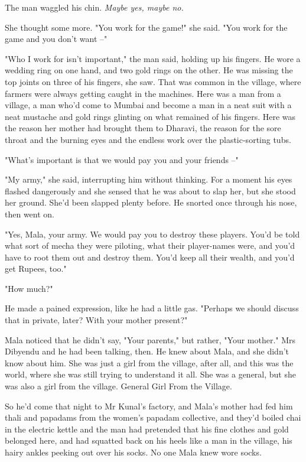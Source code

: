 The man waggled his chin. \emph{Maybe yes, maybe no.}

She thought some more. "You work for the game!" she said. "You work
for the game and you don't want --"

"Who I work for isn't important," the man said, holding up his
fingers. He wore a wedding ring on one hand, and two gold rings on
the other. He was missing the top joints on three of his fingers,
she saw. That was common in the village, where farmers were always
getting caught in the machines. Here was a man from a village, a
man who'd come to Mumbai and become a man in a neat suit with a
neat mustache and gold rings glinting on what remained of his
fingers. Here was the reason her mother had brought them to
Dharavi, the reason for the sore throat and the burning eyes and
the endless work over the plastic-sorting tubs.

"What's important is that we would pay you and your friends --"

"My army," she said, interrupting him without thinking. For a
moment his eyes flashed dangerously and she sensed that he was
about to slap her, but she stood her ground. She'd been slapped
plenty before. He snorted once through his nose, then went on.

"Yes, Mala, your army. We would pay you to destroy these players.
You'd be told what sort of mecha they were piloting, what their
player-names were, and you'd have to root them out and destroy
them. You'd keep all their wealth, and you'd get Rupees, too."

"How much?"

He made a pained expression, like he had a little gas. "Perhaps we
should discuss that in private, later? With your mother present?"

Mala noticed that he didn't say, "Your parents," but rather, "Your
mother." Mrs Dibyendu and he had been talking, then. He knew about
Mala, and she didn't know about him. She was just a girl from the
village, after all, and this was the world, where she was still
trying to understand it all. She was a general, but she was also a
girl from the village. General Girl From the Village.

So he'd come that night to Mr Kunal's factory, and Mala's mother
had fed him thali and papadams from the women's papadam collective,
and they'd boiled chai in the electric kettle and the man had
pretended that his fine clothes and gold belonged here, and had
squatted back on his heels like a man in the village, his hairy
ankles peeking out over his socks. No one Mala knew wore socks.

